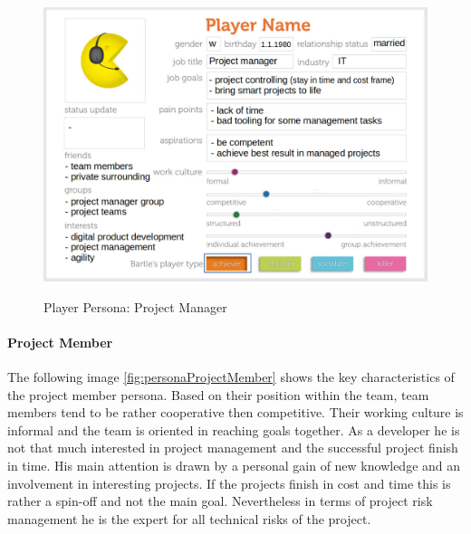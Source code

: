\begin{figure}[H]
	\centering
	\includegraphics[width=1.0\textwidth]{Content/Domain/PersonaProjectManager.png}
	\caption{Player Persona: Project Manager}
	\label{fig:personaProjectManager}
	\cite[p. 88; adapted]{kumarGamificationWorkDesigning2013}
\end{figure}

\newpage

\paragraph*{Project Member}

The following image \ref{fig:personaProjectMember} shows the key characteristics of the project member persona.
Based on their position within the team, team members tend to be rather cooperative then competitive. Their working culture is informal and the team is oriented in reaching goals together. As a developer he is not that much interested in project management and the successful project finish in time. His main attention is drawn by a personal gain of new knowledge and an involvement in interesting projects. If the projects finish in cost and time this is rather a spin-off and not the main goal. Nevertheless in terms of project risk management he is the expert for all technical risks of the project.

